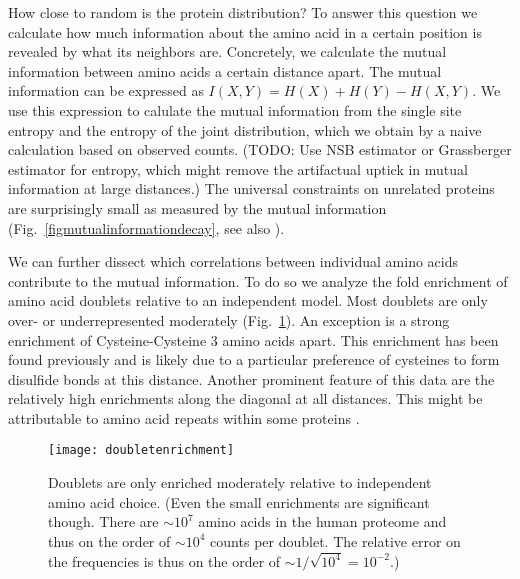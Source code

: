 \documentclass[superscriptaddress,onecolumn,pre]{revtex4}
\newcommand{\<}{\langle}
\renewcommand{\>}{\rangle}
\begin{document}
How close to random is the protein distribution? To answer this question we calculate how much information about the amino acid in a certain position is revealed by what its neighbors are. Concretely, we calculate the mutual information between amino acids a certain distance apart. The mutual information can be expressed as $I(X, Y) = H(X) + H(Y) - H(X, Y)$. We use this expression to calulate the mutual information from the single site entropy and the entropy of the joint distribution, which we obtain by a naive calculation based on observed counts. (TODO: Use NSB estimator or Grassberger estimator for entropy, which might remove the artifactual uptick in mutual information at large distances.) The universal constraints on unrelated proteins are surprisingly small as measured by the mutual information (Fig.~\ref{figmutualinformationdecay}, see also \cite{Lavelle2009}). 

We can further dissect which correlations between individual amino acids contribute to the mutual information. To do so we analyze the fold enrichment of amino acid doublets relative to an independent model. Most doublets are only over- or underrepresented moderately (Fig.~\ref{figdoubletentrichment}). An exception is a strong enrichment of Cysteine-Cysteine 3 amino acids apart. This enrichment has been found previously \cite{Greenbaum2014} and is likely due to a particular preference of cysteines to form disulfide bonds at this distance. Another prominent feature of this data are the relatively high enrichments along the diagonal at all distances. This might be attributable to amino acid repeats within some proteins \cite{Turjanski2018}.

\begin{figure}
    \texttt{[image: doubletenrichment]}
    \caption{Doublets are only enriched moderately relative to independent amino acid choice. (Even the small enrichments are significant though. There are $\sim 10^7$ amino acids in the human proteome and thus on the order of $\sim 10^4$ counts per doublet. The relative error on the frequencies is thus on the order of $\sim 1/\sqrt{10^4} = 10^{-2}$.)
    \label{figdoubletentrichment}
    }
\end{figure}


\end{document}

